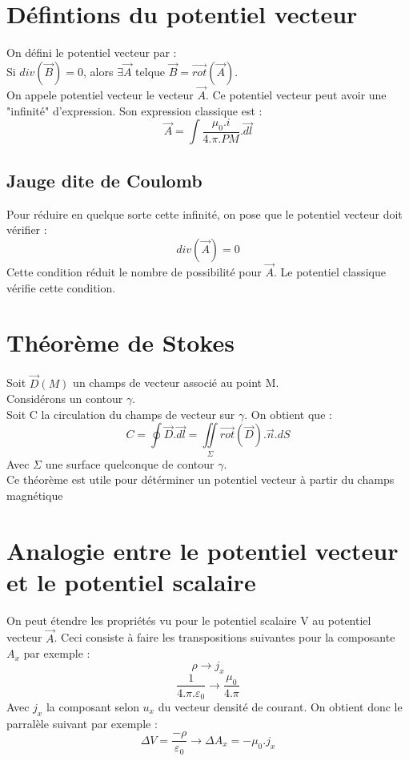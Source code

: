 \section{Défintions du potentiel vecteur}
\begin{de}
On défini le potentiel vecteur par :\\
Si $div(\overrightarrow{B})=0$, alors $\exists \overrightarrow{A}$ telque $\overrightarrow{B}=\overrightarrow{rot}(\overrightarrow{A})$.\\
On appele potentiel vecteur le vecteur $\overrightarrow{A}$. Ce potentiel vecteur peut avoir une "infinité" d'expression. Son expression classique est : 
$$\overrightarrow{A}=\int \dfrac{\mu_0.i}{4.\pi.PM}.\overrightarrow{dl}$$ 
\end{de}
\subsection{Jauge dite de Coulomb}
\begin{prop}
Pour réduire en quelque sorte cette infinité, on pose que le potentiel vecteur doit vérifier :
$$div(\overrightarrow{A}) = 0$$
Cette condition réduit le nombre de possibilité pour $\overrightarrow{A}$. Le potentiel classique vérifie cette condition.
\end{prop}
\section{Théorème de Stokes}
\begin{theo}
Soit $\overrightarrow{D}(M)$ un champs de vecteur associé au point M.\\
Considérons un contour $\gamma$.\\
Soit C la circulation du champs de vecteur sur $\gamma$. On obtient que : 
$$C = \oint \overrightarrow{D}.\overrightarrow{dl} = \underset{\Sigma}\iint \overrightarrow{rot}(\overrightarrow{D}).\overrightarrow{n}.dS$$
Avec $\Sigma$ une surface quelconque de contour $\gamma$.\\
Ce théorème est utile pour détérminer un potentiel vecteur à partir du champs magnétique
\end{theo}
\section{Analogie entre le potentiel vecteur et le potentiel scalaire}
On peut étendre les propriétés vu pour le potentiel scalaire V au potentiel vecteur $\overrightarrow{A}$. Ceci consiste à faire les transpositions suivantes pour la composante $A_x$ par exemple :
$$\rho \rightarrow j_x $$
$$\dfrac{1}{4.\pi.\varepsilon_0}\rightarrow\dfrac{\mu_0}{4.\pi}$$
Avec $j_x$ la composant selon $u_x$ du vecteur densité de courant. On obtient donc le parralèle suivant par exemple : 
$$\Delta V = \dfrac{-\rho}{\varepsilon_0} \rightarrow \Delta A_x = -\mu_0.j_x$$
